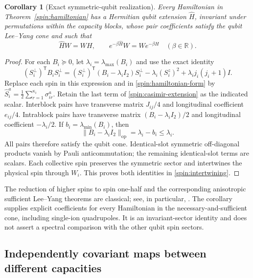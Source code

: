 \documentclass[reqno]{amsart}
\newtheorem{corollary}[theorem]{Corollary}
\theoremstyle{definition}
\theoremstyle{remark}
\newcommand{\R}{\mathbb R}
\begin{document}
\begin{corollary}[Exact symmetric-qubit realization]\label{spin:qubit-realization}
Every Hamiltonian in Theorem~\ref{spin:hamiltonian} has a Hermitian qubit
extension $\widehat H$, invariant under permutations within the capacity
blocks, whose pair coefficients satisfy the qubit Lee--Yang cone and such
that
\begin{equation}\label{spin:intertwining}
 \widehat HW=WH,\qquad e^{-\beta\widehat H}W=We^{-\beta H}
 \quad(\beta\in\R).
\end{equation}
\end{corollary}

\begin{proof}
For each $B_i\succeq0$, let $\lambda_i=\lambda_{\max}(B_i)$ and use
the exact identity
\begin{equation}\label{spin:casimir-extension}
 (S_i^\perp)^{\mathsf T}B_iS_i^\perp
 =(S_i^\perp)^{\mathsf T}(B_i-\lambda_iI_2)S_i^\perp
   -\lambda_i(S_i^z)^2+\lambda_i j_i(j_i+1)I.
\end{equation}
Replace each spin in this expression and in
\eqref{spin:hamiltonian-form} by
$\widehat S_i^a=\frac12\sum_{r=1}^{\kappa_i}\sigma_{ir}^a$.
Retain the last term of \eqref{spin:casimir-extension} as the indicated
scalar.  Interblock pairs have transverse matrix $J_{ij}/4$ and
longitudinal coefficient $e_{ij}/4$.  Intrablock pairs have transverse
matrix $(B_i-\lambda_iI_2)/2$ and longitudinal coefficient
$-\lambda_i/2$.  If $b_i=\lambda_{\min}(B_i)$, then
\[
 \|B_i-\lambda_iI_2\|_{\mathrm{op}}=\lambda_i-b_i\leq\lambda_i.
\]
All pairs therefore satisfy the qubit cone.  Identical-slot symmetric
off-diagonal products vanish by Pauli anticommutation; the remaining
identical-slot terms are scalars.  Each collective spin preserves the
symmetric sector and intertwines the physical spin through $W_i$.
This proves both identities in \eqref{spin:intertwining}.
\end{proof}

The reduction of higher spins to spin one-half and the corresponding
anisotropic sufficient Lee--Yang theorems are classical; see, in
particular, \cite[Theorem~2 and equations~(2.38)--(2.44)]{SuzukiFisher71}.
The corollary supplies explicit coefficients
for every Hamiltonian in the necessary-and-sufficient cone, including
single-ion quadrupoles.  It is an invariant-sector identity and does not
assert a spectral comparison with the other qubit spin sectors.

\subsection{Independently covariant maps between different capacities}
\end{document}
